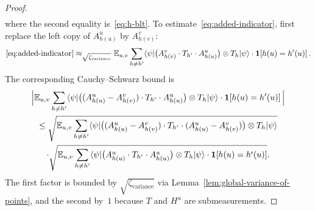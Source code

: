 \begin{proof}
\begin{align}
  \end{align}
  where the second equality is~\eqref{eq:h-blt}. To estimate~\eqref{eq:added-indicator}, first replace the left copy of $A^u_{h(u)}$ by $A^v_{h(v)}$:
  \begin{equation}\label{eq:swapped-u-for-v}
    \eqref{eq:added-indicator}
    \approx_{\sqrt{\zeta_{\mathrm{variance}}}}
    \mathbb{E}_{u,v} \sum_{h \neq h'} \langle \psi \rvert \bigl(A^{v}_{h(v)} \cdot T_{h'} \cdot A^{u}_{h(u)}\bigr) \otimes T_h \lvert \psi \rangle \cdot \mathbf{1}\!\left[h(u) = h'(u)\right].
  \end{equation}
  The corresponding Cauchy--Schwarz bound is
  \begin{multline}
    \Big|\mathbb{E}_{u,v} \sum_{h \neq h'} \langle \psi \rvert \bigl((A^{u}_{h(u)} - A^{v}_{h(v)}) \cdot T_{h'} \cdot A^{u}_{h(u)}\bigr) \otimes T_h \lvert \psi \rangle \cdot \mathbf{1}\!\left[h(u) = h'(u)\right]\Big|\\
    \leq
    \sqrt{\mathbb{E}_{u,v} \sum_{h \neq h'} \langle \psi \rvert \bigl((A^{u}_{h(u)} - A^{v}_{h(v)}) \cdot T_{h'} \cdot (A^{u}_{h(u)} - A^{v}_{h(v)})\bigr) \otimes T_h\lvert \psi \rangle}\\
    \cdot \sqrt{\mathbb{E}_{u,v} \sum_{h \neq h'} \langle \psi \rvert \bigl(A^{u}_{h(u)} \cdot T_{h'} \cdot A^{u}_{h(u)}\bigr) \otimes T_h\lvert \psi \rangle \cdot \mathbf{1}\!\left[h(u) = h'(u)\right]}. \label{eq:swapped-u-for-cauchy-schwarz}
  \end{multline}
  The first factor is bounded by $\sqrt{\zeta_{\mathrm{variance}}}$ via Lemma~\ref{lem:global-variance-of-points}, and the second by~$1$ because $T$ and $H^u$ are submeasurements.


\end{proof}
